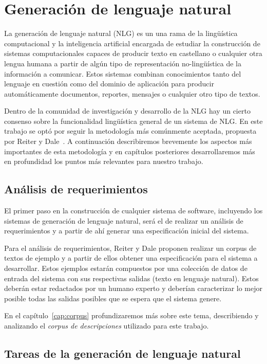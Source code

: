 \chapter{Generación de lenguaje natural}
\label{cap:nlg_intro}
La generación de lenguaje natural (NLG) es un una rama de la lingüística computacional y la inteligencia artificial encargada de estudiar la construcción de sistemas computacionales capaces de producir texto en castellano o cualquier otra lengua humana a partir de algún tipo de representación no-lingüística de la información a comunicar. Estos sistemas combinan conocimientos tanto del lenguaje en cuestión como del dominio de aplicación para producir automáticamente documentos, reportes, mensajes o cualquier otro tipo de textos.

Dentro de la comunidad de investigación y desarrollo de la NLG hay un cierto consenso sobre la funcionalidad lingüística general de un sistema de NLG.
En este trabajo se optó por seguir la metodología más comúnmente aceptada, propuesta por Reiter y Dale~\cite{reiter_dale}.
A continuación describiremos brevemente los aspectos más importantes de esta metodología y en capítulos posteriores desarrollaremos más en profundidad los puntos más relevantes para nuestro trabajo.

\section{Análisis de requerimientos}
El primer paso en la construcción de cualquier sistema de software, incluyendo los sistemas de generación de lenguaje natural, será el de realizar un análisis de requerimientos y a partir de ahí generar una especificación inicial del sistema. 

Para el análisis de requerimientos, Reiter y Dale proponen realizar un corpus de textos de ejemplo y a partir de ellos obtener una especificación para el sistema a desarrollar. Estos ejemplos estarán compuestos por una colección de datos de entrada del sistema con sus respectivas salidas (texto en lenguaje natural). Estos deberán estar redactados por un humano experto y deberían caracterizar lo mejor posible todas las salidas posibles que se espera que el sistema genere.

En el capítulo~\ref{cap:corpus} profundizaremos más sobre este tema, describiendo y analizando el \emph{corpus de descripciones} utilizado para este trabajo.

\section{Tareas de la generación de lenguaje natural}
\label{sec:tareas_nlg}

